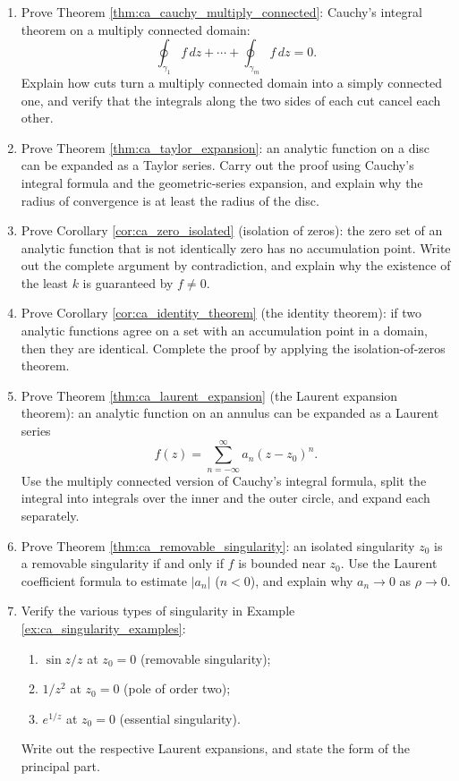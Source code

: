 \begin{enumerate}[leftmargin=3em, label=\textbf{Exercise \arabic*}]
    \item Prove Theorem \ref{thm:ca_cauchy_multiply_connected}:
    Cauchy's integral theorem on a multiply connected domain:
    \[
    \oint_{\gamma_1}f\,dz+\cdots+\oint_{\gamma_m}f\,dz=0.
    \]
    Explain how cuts turn a multiply connected domain into a simply connected one,
    and verify that the integrals along the two sides of each cut cancel each other.

    \item Prove Theorem \ref{thm:ca_taylor_expansion}:
    an analytic function on a disc can be expanded as a Taylor series.
    Carry out the proof using Cauchy's integral formula and the geometric-series expansion,
    and explain why the radius of convergence is at least the radius of the disc.

    \item Prove Corollary \ref{cor:ca_zero_isolated} (isolation of zeros):
    the zero set of an analytic function that is not identically zero has no accumulation point.
    Write out the complete argument by contradiction,
    and explain why the existence of the least $k$ is guaranteed by $f\neq 0$.

    \item Prove Corollary \ref{cor:ca_identity_theorem} (the identity theorem):
    if two analytic functions agree on a set with an accumulation point in a domain, then they are identical.
    Complete the proof by applying the isolation-of-zeros theorem.

    \item Prove Theorem \ref{thm:ca_laurent_expansion} (the Laurent expansion theorem):
    an analytic function on an annulus can be expanded as a Laurent series
    \[
    f(z)=\sum_{n=-\infty}^{\infty}a_n(z-z_0)^n.
    \]
    Use the multiply connected version of Cauchy's integral formula,
    split the integral into integrals over the inner and the outer circle, and expand each separately.

    \item Prove Theorem \ref{thm:ca_removable_singularity}:
    an isolated singularity $z_0$ is a removable singularity if and only if $f$ is bounded near $z_0$.
    Use the Laurent coefficient formula to estimate $|a_n|$ ($n<0$),
    and explain why $a_n\to 0$ as $\rho\to 0$.

    \item Verify the various types of singularity in Example \ref{ex:ca_singularity_examples}:
    \begin{enumerate}[label=(\roman*)]
        \item $\sin z/z$ at $z_0=0$ (removable singularity);
        \item $1/z^2$ at $z_0=0$ (pole of order two);
        \item $e^{1/z}$ at $z_0=0$ (essential singularity).
    \end{enumerate}
    Write out the respective Laurent expansions,
    and state the form of the principal part.


\end{enumerate}
